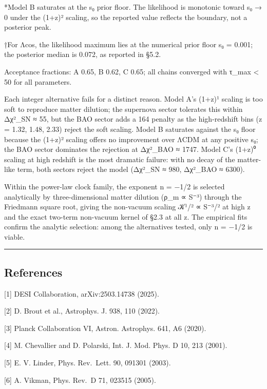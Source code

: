 *Model B saturates at the s₀ prior floor. The likelihood is monotonic
toward s₀ → 0 under the (1+z)² scaling, so the reported value reflects
the boundary, not a posterior peak.

†For Λcos, the likelihood maximum lies at the numerical prior floor s₀ =
0.001; the posterior median is 0.072, as reported in §5.2.

Acceptance fractions: A 0.65, B 0.62, C 0.65; all chains converged with
τ\_max \textless{} 50 for all parameters.

Each integer alternative fails for a distinct reason. Model A's (1+z)¹
scaling is too soft to reproduce matter dilution; the supernova sector
tolerates this within Δχ²\_SN ≈ 55, but the BAO sector adds a 164
penalty as the high-redshift bins (z = 1.32, 1.48, 2.33) reject the soft
scaling. Model B saturates against the s₀ floor because the (1+z)²
scaling offers no improvement over ΛCDM at any positive s₀; the BAO
sector dominates the rejection at Δχ²\_BAO ≈ 1747. Model C's (1+z)⁰
scaling at high redshift is the most dramatic failure: with no decay of
the matter-like term, both sectors reject the model (Δχ²\_SN ≈ 980,
Δχ²\_BAO ≈ 6300).

Within the power-law clock family, the exponent n = −1/2 is selected
analytically by three-dimensional matter dilution (ρ\_m ∝ S⁻³) through
the Friedmann square root, giving the non-vacuum scaling 𝒦¹/² ∝ S⁻³/² at
high z and the exact two-term non-vacuum kernel of §2.3 at all z. The
empirical fits confirm the analytic selection: among the alternatives
tested, only n = −1/2 is viable.

\begin{center}\rule{0.5\linewidth}{0.5pt}\end{center}

\subsection{References}\label{references}

{[}1{]} DESI Collaboration, arXiv:2503.14738 (2025).

{[}2{]} D. Brout et al., Astrophys. J. 938, 110 (2022).

{[}3{]} Planck Collaboration VI, Astron. Astrophys. 641, A6 (2020).

{[}4{]} M. Chevallier and D. Polarski, Int. J. Mod. Phys. D 10, 213
(2001).

{[}5{]} E. V. Linder, Phys. Rev.~Lett. 90, 091301 (2003).

{[}6{]} A. Vikman, Phys. Rev.~D 71, 023515 (2005).


